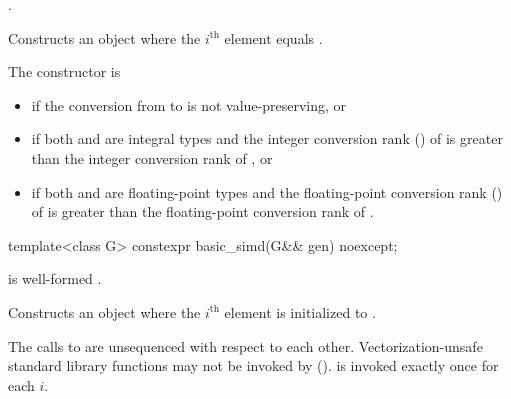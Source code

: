 \begin{itemdescr}
  \pnum\constraints
  .

  \pnum\effects
  Constructs an object where the $i^\text{th}$ element equals  \foralli.

  \pnum\remarks
  The constructor is 
  \begin{itemize}
    \item if the conversion from  to  is not
      value-preserving, or

    \item if both  and  are integral types and the
      integer conversion rank () of  is greater than
      the integer conversion rank of , or

    \item if both  and  are floating-point types and
      the floating-point conversion rank () of  is
      greater than the floating-point conversion rank of .
  \end{itemize}
\end{itemdescr}

\begin{itemdecl}
template<class G> constexpr basic_simd(G&& gen) noexcept;
\end{itemdecl}

\begin{itemdescr}
  \pnum\constraints
   is well-formed
  \foralli.

  \pnum\effects
  Constructs an object where the $i^\text{th}$ element is initialized to
  .

  \pnum
    The calls to  are unsequenced with respect to each other. Vectorization-unsafe standard library functions may not be invoked by  ().  is invoked exactly once for each $i$.
\end{itemdescr}

\newcommand\SimdLoadDescr[2]{
  \pnum\constraints
  \begin{itemize}
    \item \tcode{iter_value_t<It>} is a vectorizable type, and
    \item \tcode{It} satisfies \tcode{contiguous_iterator}.
  \end{itemize}

  \pnum\mandates
  \conversionFlagsMandate{iter_value_t<It>}{value_type}

  \pnum\expects
  \begin{itemize}
    \item #1
    \item \tcode{It} models \tcode{contiguous_iterator}.
    \flagsRequires{basic_simd, iter_value_t<It>}{iter_value_t<It>}
  \end{itemize}

  \pnum\effects #2

  \pnum\throws Nothing.
}

